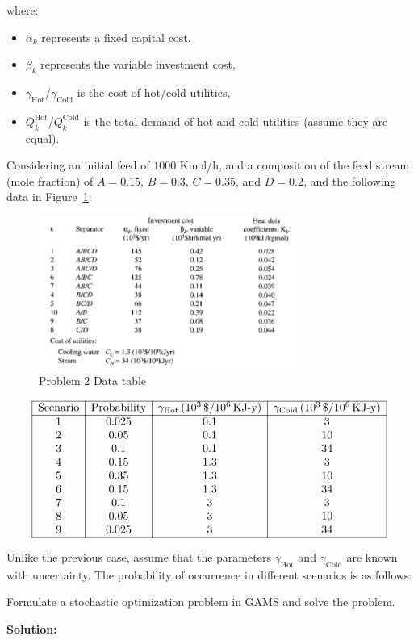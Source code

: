 \documentclass[11pt]{article}
\begin{document}
where:
\begin{itemize}
    \item $\alpha_k$ represents a fixed capital cost,
    \item $\beta_k$ represents the variable investment cost,
    \item $\gamma_{\text{Hot}}$/$\gamma_{\text{Cold}}$ is the cost of hot/cold utilities,
    \item $Q_k^{\text{Hot}}$/$Q_k^{\text{Cold}}$ is the total demand of hot and cold utilities (assume they are equal).
\end{itemize}

Considering an initial feed of $1000$ Kmol/h, and a composition of the feed stream (mole fraction) of $A=0.15$, $B=0.3$, $C=0.35$, and $D=0.2$, and the following data in Figure~\ref{fig:prob2_table}:

\begin{figure}[htbp]
  \centerline{\includegraphics[width=0.75\textwidth]{images/prob2_table.png}}
  \caption{Problem 2 Data table}
  \label{fig:prob2_table}
\end{figure}

\[
\begin{array}{|c|c|c|c|c|}
\hline
\text{Scenario} & \text{Probability} & \gamma_{\text{Hot}} \, (10^3 \, \$/10^6 \, \text{KJ-y}) & \gamma_{\text{Cold}} \, (10^3 \, \$/10^6 \, \text{KJ-y}) \\
\hline
1 & 0.025 & 0.1 & 3 \\
2 & 0.05 & 0.1 & 10 \\
3 & 0.1 & 0.1 & 34 \\
4 & 0.15 & 1.3 & 3 \\
5 & 0.35 & 1.3 & 10 \\
6 & 0.15 & 1.3 & 34 \\
7 & 0.1 & 3 & 3 \\
8 & 0.05 & 3 & 10 \\
9 & 0.025 & 3 & 34 \\
\hline
\end{array}
\]

Unlike the previous case, assume that the parameters $\gamma_{\text{Hot}}$ and $\gamma_{\text{Cold}}$ are known with uncertainty. The probability of occurrence in different scenarios is as follows:




Formulate a stochastic optimization problem in GAMS and solve the problem.

\textbf{Solution:}
\end{document}
